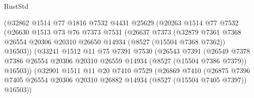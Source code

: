 \begin{lexlean}{RustStd}
\begin{coremodule}
                        (@32862
                          @1514
                          @77
                          @1816
                          @7532
                          @4431
                          @25629
                          (@20263
                            @1514
                            @77
                            @7532
                            (@26630
                              @1513
                              @73
                              @76
                              @7373
                              @7531
                              (@26637
                                @7373
                                (@32879
                                  @7361
                                  @7368
                                  @26554
                                  @20306
                                  @20310
                                  @26650
                                  @14934
                                  (@8527 (@15504 @7368 @7362))
                                  @16503))
                              (@33241
                                @1512
                                @11
                                @75
                                @7391
                                @7530
                                (@26543
                                  @7391
                                  (@26549
                                    @7378
                                    @7386
                                    @26554
                                    @20306
                                    @20310
                                    @26559
                                    @14934
                                    (@8527 (@15504 @7386 @7379))
                                    @16503))
                                (@32901
                                  @1511
                                  @11
                                  @20
                                  @7410
                                  @7529
                                  (@26869
                                    @7410
                                    (@26875
                                      @7396
                                      @7405
                                      @26554
                                      @20306
                                      @20310
                                      @26882
                                      @14934
                                      (@8527 (@15504 @7405 @7397))
                                      @16503))

\end{coremodule}
\end{lexlean}
